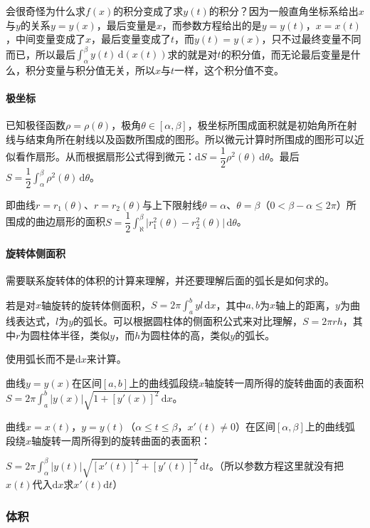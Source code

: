 \documentclass[UTF8, 12pt]{ctexart}
\begin{document}
会很奇怪为什么求$f(x)$的积分变成了求$y(t)$的积分？因为一般直角坐标系给出$x$与$y$的关系$y=y(x)$，最后变量是$x$，而参数方程给出的是$y=y(t)$，$x=x(t)$，中间变量变成了$x$，最后变量变成了$t$，而$y(t)=y(x)$，只不过最终变量不同而已，所以最后$\int_\alpha^\beta y(t)\,\textrm{d}(x(t))$求的就是对$t$的积分值，而无论最后变量是什么，积分变量与积分值无关，所以$x$与$t$一样，这个积分值不变。

\paragraph{极坐标} \leavevmode \medskip

已知极径函数$\rho=\rho(\theta)$，极角$\theta\in[\alpha,\beta]$，极坐标所围成面积就是初始角所在射线与结束角所在射线以及函数所围成的图形。所以微元计算时所围成的图形可以近似看作扇形。从而根据扇形公式得到微元：$\textrm{d}S=\dfrac{1}{2}\rho^2(\theta)\,\textrm{d}\theta$。最后$S=\dfrac{1}{2}\int_\alpha^\beta\rho^2(\theta)\,\textrm{d}\theta$。

即曲线$r=r_1(\theta)$、$r=r_2(\theta)$与上下限射线$\theta=\alpha$、$\theta=\beta$（$0<\beta-\alpha\leqslant2\pi$）所围成的曲边扇形的面积$S=\dfrac{1}{2}\int_\aleph^\beta\vert r_1^2(\theta)-r_2^2(\theta)\vert\,\textrm{d}\theta$。

\paragraph{旋转体侧面积} \leavevmode \medskip

需要联系旋转体的体积的计算来理解，并还要理解后面的弧长是如何求的。

若是对$x$轴旋转的旋转体侧面积，$S=2\pi\int_a^byl\,\textrm{d}x$，其中$a,b$为$x$轴上的距离，$y$为曲线表达式，$l$为$y$的弧长。可以根据圆柱体的侧面积公式来对比理解，$S=2\pi rh$，其中$r$为圆柱体半径，类似$y$，而$h$为圆柱体的高，类似$y$的弧长。

使用弧长而不是$\textrm{d}x$来计算。

曲线$y=y(x)$在区间$[a,b]$上的曲线弧段绕$x$轴旋转一周所得的旋转曲面的表面积$S=2\pi\int_a^b\vert y(x)\vert\sqrt{1+[y'(x)]^2}\,\textrm{d}x$。

曲线$x=x(t)$，$y=y(t)$（$\alpha\leqslant t\leqslant\beta$，$x'(t)\neq0$）在区间$[\alpha,\beta]$上的曲线弧段绕$x$轴旋转一周所得到的旋转曲面的表面积：

$S=2\pi\int_\alpha^\beta\vert y(t)\vert\sqrt{[x'(t)]^2+[y'(t)]^2}\,\textrm{d}t$。（所以参数方程这里就没有把$x(t)$代入$\textrm{d}x$求$x'(t)\textrm{d}t$）

\subsubsection{体积}
\end{document}
